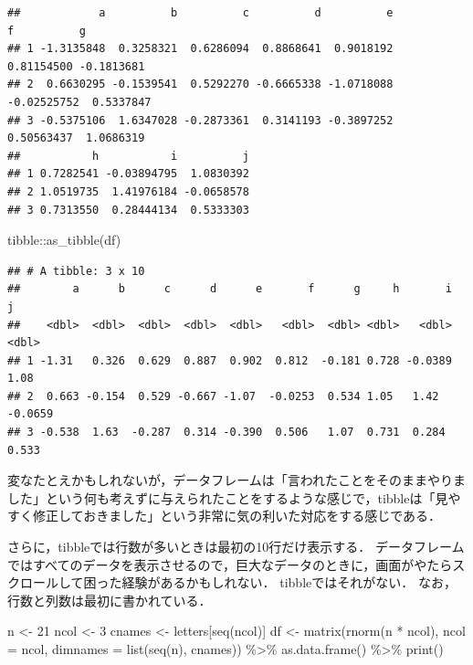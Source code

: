 \documentclass[
]{article}
\newenvironment{Shaded}{\begin{snugshade}}{\end{snugshade}}
\newcommand{\AttributeTok}[1]{\textcolor[rgb]{0.77,0.63,0.00}{#1}}
\newcommand{\DecValTok}[1]{\textcolor[rgb]{0.00,0.00,0.81}{#1}}
\newcommand{\FunctionTok}[1]{\textcolor[rgb]{0.00,0.00,0.00}{#1}}
\newcommand{\NormalTok}[1]{#1}
\newcommand{\OtherTok}[1]{\textcolor[rgb]{0.56,0.35,0.01}{#1}}
\newcommand{\SpecialCharTok}[1]{\textcolor[rgb]{0.00,0.00,0.00}{#1}}
\begin{document}
\begin{verbatim}
##            a          b          c          d          e           f          g
## 1 -1.3135848  0.3258321  0.6286094  0.8868641  0.9018192  0.81154500 -0.1813681
## 2  0.6630295 -0.1539541  0.5292270 -0.6665338 -1.0718088 -0.02525752  0.5337847
## 3 -0.5375106  1.6347028 -0.2873361  0.3141193 -0.3897252  0.50563437  1.0686319
##           h           i          j
## 1 0.7282541 -0.03894795  1.0830392
## 2 1.0519735  1.41976184 -0.0658578
## 3 0.7313550  0.28444134  0.5333303
\end{verbatim}

\begin{Shaded}
\begin{Highlighting}[]
\NormalTok{tibble}\SpecialCharTok{::}\FunctionTok{as\_tibble}\NormalTok{(df)}
\end{Highlighting}
\end{Shaded}

\begin{verbatim}
## # A tibble: 3 x 10
##        a      b      c      d      e       f      g     h       i       j
##    <dbl>  <dbl>  <dbl>  <dbl>  <dbl>   <dbl>  <dbl> <dbl>   <dbl>   <dbl>
## 1 -1.31   0.326  0.629  0.887  0.902  0.812  -0.181 0.728 -0.0389  1.08  
## 2  0.663 -0.154  0.529 -0.667 -1.07  -0.0253  0.534 1.05   1.42   -0.0659
## 3 -0.538  1.63  -0.287  0.314 -0.390  0.506   1.07  0.731  0.284   0.533
\end{verbatim}

変なたとえかもしれないが，データフレームは「言われたことをそのままやりました」という何も考えずに与えられたことをするような感じで，tibbleは「見やすく修正しておきました」という非常に気の利いた対応をする感じである．

さらに，tibbleでは行数が多いときは最初の10行だけ表示する．
データフレームではすべてのデータを表示させるので，巨大なデータのときに，画面がやたらスクロールして困った経験があるかもしれない．
tibbleではそれがない．
なお，行数と列数は最初に書かれている．

\begin{Shaded}
\begin{Highlighting}[]
\NormalTok{n }\OtherTok{\textless{}{-}} \DecValTok{21}
\NormalTok{ncol }\OtherTok{\textless{}{-}} \DecValTok{3}
\NormalTok{cnames }\OtherTok{\textless{}{-}}\NormalTok{ letters[}\FunctionTok{seq}\NormalTok{(ncol)]}
\NormalTok{df }\OtherTok{\textless{}{-}} 
  \FunctionTok{matrix}\NormalTok{(}\FunctionTok{rnorm}\NormalTok{(n }\SpecialCharTok{*}\NormalTok{ ncol), }\AttributeTok{ncol =}\NormalTok{ ncol, }\AttributeTok{dimnames =} \FunctionTok{list}\NormalTok{(}\FunctionTok{seq}\NormalTok{(n), cnames)) }\SpecialCharTok{\%\textgreater{}\%}
  \FunctionTok{as.data.frame}\NormalTok{() }\SpecialCharTok{\%\textgreater{}\%}
  \FunctionTok{print}\NormalTok{()}
\end{Highlighting}
\end{Shaded}
\end{document}

